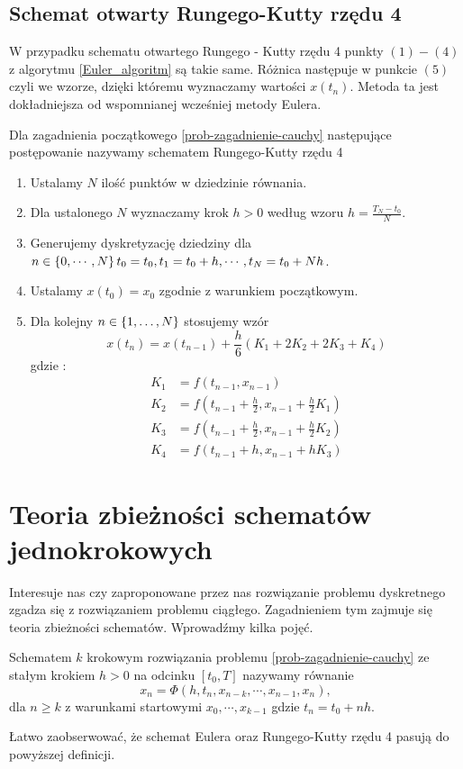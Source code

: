\documentclass[12pt,a4paper]{report}
\begin{document}
\subsection{Schemat otwarty Rungego-Kutty rzędu 4}
W przypadku schematu otwartego Rungego - Kutty rzędu 4 punkty $ (1) - (4) $ z algorytmu \ref{Euler_algoritm} są takie same. Różnica następuje w punkcie $(5)$ czyli we wzorze, dzięki któremu wyznaczamy wartości $x(t_n)$. Metoda ta jest dokładniejsza od wspomnianej wcześniej metody Eulera.
\begin{algorithm}
Dla zagadnienia początkowego \ref{prob-zagadnienie-cauchy} następujące postępowanie nazywamy schematem Rungego-Kutty rzędu 4 
\begin{enumerate}
\item Ustalamy $N$ ilość punktów w dziedzinie równania. 
\item Dla ustalonego $N$ wyznaczamy krok $h>0$ według wzoru $h=\frac{T_N-t_0}{N}$. 
\item Generujemy dyskretyzację dziedziny dla $n \in \left\lbrace {0,\cdots,N} \right\rbrace  t_0 = t_0, t_1 = t_0 + h, \cdots, t_N = t_{0}+ Nh$. 
\item Ustalamy $x(t_0) = x_0$ zgodnie z warunkiem początkowym.
\item Dla kolejny $n \in \left\lbrace {1, \ldots, N} \right\rbrace$ stosujemy wzór
$$
x(t_{n}) = x(t_{n-1}) + \frac{h}{6} ( K_1 + 2K_2 + 2K_3 + K_4 )
$$
gdzie :
$$
\begin{array}{cl}
K_1 &= f(t_{n-1},x_{n-1}) \\
K_2 &= f(t_{n-1} + \frac{h}{2}, x_{n-1} + \frac{h}{2} K_1) \\
K_3 &= f(t_{n-1} + \frac{h}{2}, x_{n-1} + \frac{h}{2} K_2) \\
K_4 &= f(t_{n-1} + h, x_{n-1} + hK_3) 
\end{array}
$$
\end{enumerate}
\end{algorithm}

\section{Teoria zbieżności schematów jednokrokowych}
Interesuje nas czy zaproponowane przez nas rozwiązanie problemu dyskretnego zgadza się z rozwiązaniem problemu ciągłego. Zagadnieniem tym zajmuje się teoria zbieżności schematów. Wprowadźmy kilka pojęć. 

\begin{definition}
Schematem $k$ krokowym rozwiązania problemu \ref{prob-zagadnienie-cauchy} ze stałym krokiem $h>0$ na odcinku $[t_0,T]$ nazywamy równanie
\begin{equation}\label{k-steps-scheme}
x_n = \Phi (h,t_n,x_{n-k},\cdots,x_{n-1},x_n) ,
\end{equation}
dla $ n \geq k$ z warunkami startowymi $x_0,\cdots, x_{k-1}$ gdzie $t_n = t_0 + nh$.
\end{definition}
Łatwo zaobserwować, że schemat Eulera oraz Rungego-Kutty rzędu 4 pasują do powyższej definicji. 
\end{document}
